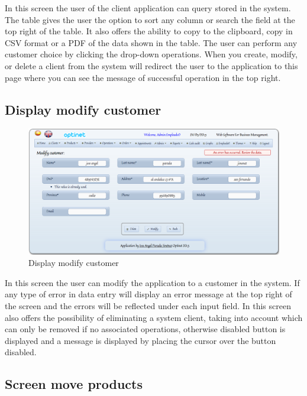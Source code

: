 \documentclass[a4paper,11pt]{book}
\begin{document}
In this screen the user of the client application can query stored in the system. The table gives the user the option to sort any column or search the field at the top right of the table. It also offers the ability to copy to the clipboard, copy in CSV format or a PDF of the data shown in the table. The user can perform any customer choice by clicking the drop-down operations. When you create, modify, or delete a client from the system will redirect the user to the application to this page where you can see the message of successful operation in the top right.

\newpage
\subsection {Display modify customer}

\begin{figure}[!htb]
  \centering
    \includegraphics[scale=0.35]{icapmodificarcliente.png}
  \caption{Display modify customer}
  \label{a}
\end{figure}

In this screen the user can modify the application to a customer in the system. If any type of error in data entry will display an error message at the top right of the screen and the errors will be reflected under each input field. In this screen also offers the possibility of eliminating a system client, taking into account which can only be removed if no associated operations, otherwise disabled button is displayed and a message is displayed by placing the cursor over the button disabled.

\newpage
\subsection {Screen move products}
\end{document}
